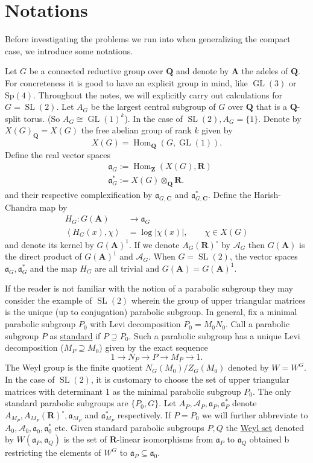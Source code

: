 \documentclass[11pt]{amsart}
\def\A{\mathbf A}
\def\C{\mathbf C}
\def\Q{\mathbf Q}
\def\R{\mathbf R}
\def\Z{\mathbf Z}
\def\AAA{\mathcal A}	%
\def\aaa{\mathfrak a}
\def\gl{\operatorname{GL}}
\def\hom{\operatorname{Hom}}
\def\mod#1{\lvert #1 \rvert} %
\def\sl{\operatorname{SL}}
\def\sprod#1#2{\left\langle #1 , #2 \right\rangle}  %
\theoremstyle{remark}
\begin{document}
\section{Notations} \label{sec_not1}

Before investigating the problems we run into when generalizing the compact case, we introduce some notations. 

Let $G$ be a connected reductive group over $\Q$ and denote by $\A$ the adeles of $\Q$. For concreteness it is good to have an explicit group in mind, like $\gl(3)$ or $\text{Sp}(4)$. Throughout the notes, we will explicitly carry out calculations for $G = \sl(2)$. Let $A_G$ be the largest central subgroup of $G$ over $\Q$ that is a $\Q$-split torus. (So $A_G \cong \gl(1)^k$). In the case of $\sl(2), A_G = \{1\}$. Denote by $X(G)_\Q = X(G)$ the free abelian group of rank $k$ given by
\[ X(G) = \hom_\Q(G, \gl(1)). \]
Define the real vector spaces
\begin{align*}
	& \aaa_G := \hom_\Z(X(G), \R) \\
	& \aaa_G^* := X(G) \otimes_\Q \R.
\end{align*}
and their respective complexification by $\aaa_{G, \C}$ and $\aaa_{G, \C}^*$. 
Define the Harish-Chandra map by
\begin{align*}
	H_G : G(\A) & \to \aaa_G \\
	\sprod{H_G(x)}{\chi} & = \log \mod{\chi(x)}, \qquad \chi \in X(G)
\end{align*}
and denote its kernel by $G(\A)^1$. If we denote $A_G(\R)^\circ$ by $\AAA_G$ then $G(\A)$ is the direct product of $G(\A)^1$ and $\AAA_G$. When $G = \sl(2)$, the vector spaces $\aaa_G, \aaa_G^*$ and the map $H_G$ are all trivial and $G(\A) = G(\A)^1$.

If the reader is not familiar with the notion of a parabolic subgroup they may consider the example of $\sl(2)$ wherein the group of upper triangular matrices is the unique (up to conjugation) parabolic subgroup. In general, fix a minimal parabolic subgroup $P_0$ with Levi decomposition $P_0 = M_0 N_0$. Call a parabolic subgroup $P$ as \underline{standard} if $P \supseteq P_0$.  Such a parabolic subgroup has a unique Levi decomposition ($M_P \supseteq M_0$) given by the exact sequence
\[ 1 \to N_P \to P \to M_P \to 1. \]
The Weyl group is the finite quotient $N_G(M_0)/Z_G(M_0)$ denoted by $W = W^G$. In the case of $\sl(2)$, it is customary to choose the set of upper triangular matrices with determinant 1 as the minimal parabolic subgroup $P_0$. The only standard parabolic subgroups are $\{P_0, G\}$.
Let $A_P, \AAA_P, \aaa_P, \aaa_P^*$ denote $A_{M_P}, A_{M_P}(\R)^\circ, \aaa_{M_P}$ and $\aaa_{M_P}^*$ respectively. If $P = P_0$ we will further abbreviate to $A_0, \AAA_0, \aaa_0, \aaa_0^*$ etc. Given standard parabolic subgroups $P, Q$ the \underline{Weyl set} denoted by $W(\aaa_P, \aaa_Q)$ is the set of $\R$-linear isomorphisms from $\aaa_P$ to $\aaa_Q$ obtained b restricting the elements of $W^G$ to $\aaa_P \subseteq \aaa_0$. 
\end{document}
